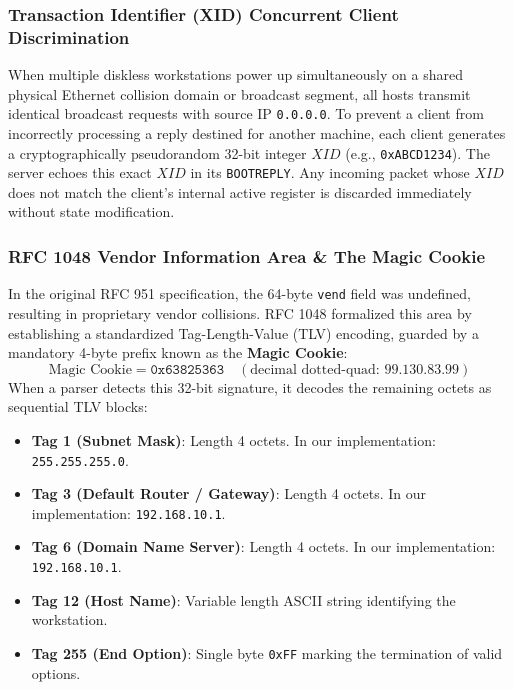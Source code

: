 \documentclass[12pt, a4paper]{article}
\begin{document}
\subsubsection{Transaction Identifier (XID) Concurrent Client Discrimination}
When multiple diskless workstations power up simultaneously on a shared physical Ethernet collision domain or broadcast segment, all hosts transmit identical broadcast requests with source IP \texttt{0.0.0.0}. To prevent a client from incorrectly processing a reply destined for another machine, each client generates a cryptographically pseudorandom 32-bit integer $XID$ (e.g., \texttt{0xABCD1234}). The server echoes this exact $XID$ in its \texttt{BOOTREPLY}. Any incoming packet whose $XID$ does not match the client's internal active register is discarded immediately without state modification.

\subsubsection{RFC 1048 Vendor Information Area \& The Magic Cookie}
In the original RFC 951 specification, the 64-byte \texttt{vend} field was undefined, resulting in proprietary vendor collisions. RFC 1048 formalized this area by establishing a standardized Tag-Length-Value (TLV) encoding, guarded by a mandatory 4-byte prefix known as the \textbf{Magic Cookie}:
\begin{equation}
    \text{Magic Cookie} = \texttt{0x63825363} \quad (\text{decimal dotted-quad: } 99.130.83.99)
\end{equation}
When a parser detects this 32-bit signature, it decodes the remaining octets as sequential TLV blocks:
\begin{itemize}
    \item \textbf{Tag 1 (Subnet Mask)}: Length 4 octets. In our implementation: \texttt{255.255.255.0}.
    \item \textbf{Tag 3 (Default Router / Gateway)}: Length 4 octets. In our implementation: \texttt{192.168.10.1}.
    \item \textbf{Tag 6 (Domain Name Server)}: Length 4 octets. In our implementation: \texttt{192.168.10.1}.
    \item \textbf{Tag 12 (Host Name)}: Variable length ASCII string identifying the workstation.
    \item \textbf{Tag 255 (End Option)}: Single byte \texttt{0xFF} marking the termination of valid options.
\end{itemize}
\end{document}
